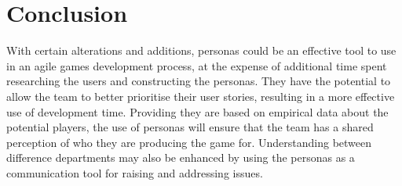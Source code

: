 \documentclass{scrartcl}
\begin{document}
\section{Conclusion}
With certain alterations and additions, personas could be an effective tool to use in an agile games development process, at the expense of additional time spent researching the users and constructing the personas. They have the potential to allow the team to better prioritise their user stories, resulting in a more effective use of development time. Providing they are based on empirical data about the potential players, the use of personas will ensure that the team has a shared perception of who they are producing the game for. Understanding between difference departments may also be enhanced by using the personas as a communication tool for raising and addressing issues.



\end{document}
